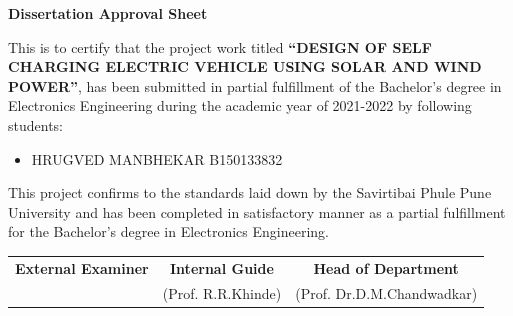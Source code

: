 \documentclass[a4paper,12pt]{article}
\begin{document}
\newpage
\thispagestyle{empty}
\begin{center}
\Large\textbf{Dissertation Approval Sheet}\\[1cm]
\end{center}
\large This is to certify that the project work titled \textbf{“DESIGN OF SELF CHARGING ELECTRIC VEHICLE USING SOLAR AND WIND POWER”}, has been submitted in partial fulfillment of the Bachelor’s degree in Electronics Engineering during the academic year of 2021-2022 by following students:\\[2cm]
\begin{itemize}
\item HRUGVED MANBHEKAR {B150133832}\\[2cm]

\end{itemize}
\large This project confirms to the standards laid down by the Savirtibai Phule Pune University and has been completed in satisfactory manner as a partial fulfillment for the Bachelor’s degree in Electronics Engineering.\\[2in]
\begin{tabular}{c c c}
\textbf{External Examiner} & \hspace{0.15cm} \textbf{Internal Guide} & \hspace{0.15cm} \textbf{Head of Department}\\

               & \hspace{0.9cm}(Prof. R.R.Khinde)  & \hspace{1cm}(Prof. Dr.D.M.Chandwadkar)\\
\end{tabular}\\

\end{document}
